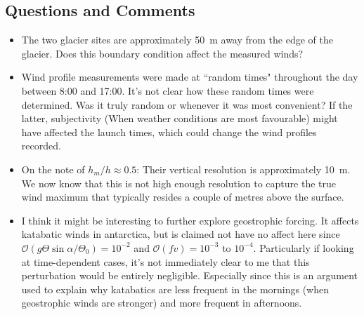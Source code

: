 \documentclass{article}
\begin{document}
\subsection*{Questions and Comments}
\begin{itemize}
    \item The two glacier sites are approximately 50~m away from the edge of the glacier. Does this boundary condition affect the measured winds?
    \item Wind profile measurements were made at ``random times" throughout the day between 8:00 and 17:00. It's not clear how these random times were determined. Was it truly random or whenever it was most convenient? If the latter, subjectivity (When weather conditions are most favourable) might have affected the launch times, which could change the wind profiles recorded.
    \item On the note of \(h_m/h\approx0.5\): Their vertical resolution is approximately \SI{10}{\m}. We now know that this is not high enough resolution to capture the true wind maximum that typically resides a couple of metres above the surface.
    \item I think it might be interesting to further explore geostrophic forcing. It affects katabatic winds in antarctica, but is claimed not have no affect here since \(\mathcal{O}(g\Theta\sin\alpha/\Theta_0)=10^{-2}\) and \(\mathcal{O}(fv)=10^{-3}\) to \(10^{-4}\). Particularly if looking at time-dependent cases, it's not immediately clear to me that this perturbation would be entirely negligible. Especially since this is an argument used to explain why katabatics are less frequent in the mornings (when geostrophic winds are stronger) and more frequent in afternoons.
\end{itemize}
\newpage






\printbibliography
% 
% 
\end{document}
